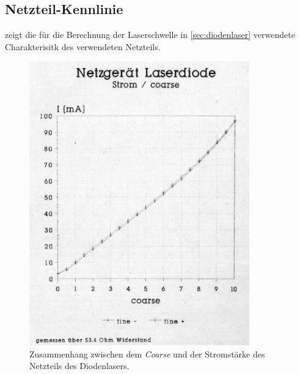 \documentclass[../bericht.tex]{subfiles}
\begin{document}
  \begin{appendices}

    \section{Netzteil-Kennlinie}
    \label{sec:netzteil-kennlinie}
       zeigt die für die Berechnung der Laserschwelle in \cref{sec:diodenlaser} verwendete Charakterisitk des verwendeten Netzteils.

      \begin{figure}[H]
        \centering
        \includegraphics[width=0.85\textwidth]{figures/Stromkennlinie_Laserdiode.pdf}
        \caption{Zusammenhang zwischen dem \textit{Coarse} und der Stromstärke des Netzteils des Diodenlasers.}
        \label{fig:netzteil-kennlinie}
      \end{figure}
  \end{appendices}
\end{document}
